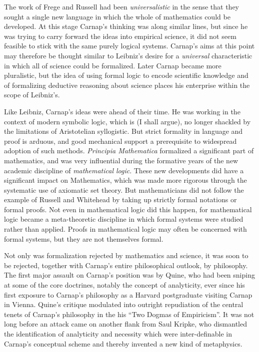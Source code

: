 The work of Frege and Russell had been \emph{universalistic} in the
sense that they sought a single new language in which the whole of
mathematics could be developed. 
At this stage Carnap's thinking was along similar lines, but since he
was trying to carry forward the ideas into empirical science, it did
not seem feasible to stick with the same purely logical systems. 
Carnap's aims at this point may therefore be thought similar to
Leibniz's desire for a \emph{universal} characteristic in which all of
science could be formalized. 
Later Carnap became more pluralistic, but the idea of using formal
logic to encode scientific knowledge and of formalizing deductive
reasoning about science places his enterprise within the scope of
Leibniz's. 

Like Leibniz, Carnap's ideas were ahead of their time.
He was working in the context of modern symbolic logic, which is (I
shall argue), no longer shackled by the limitations of Aristotelian
syllogistic. 
But strict formality in language and proof is arduous, and good
mechanical support a prerequisite to widespread adoption of such
methods. 
\emph{Principia Mathematica} formalized a significant part of
mathematics, and was very influential during the formative years of
the new academic discipline of \emph{mathematical logic}. 
These new developments did have a significant impact on Mathematics,
which was made more rigorous through the systematic use of axiomatic
set theory. 
But mathematicians did not follow the example of Russell and Whitehead
by taking up strictly formal notations or formal proofs. 
Not even in mathematical logic did this happen, for mathematical logic
became a meta-theoretic discipline in which formal systems were
studied rather than applied. 
Proofs in mathematical logic may often be concerned with formal
systems, but they are not themselves formal. 

Not only was formalization rejected by mathematics and science, it was
soon to be rejected, together with Carnap's entire philosophical
outlook, by philosophy. 
The first major assault on Carnap's position was by Quine, who had
been sniping at some of the core doctrines, notably the concept of
analyticity, ever since his first exposure to Carnap's philosophy as a
Harvard postgraduate visiting Carnap in Vienna. 
Quine's critique modulated into outright repudiation of the central
tenets of Carnap's philosophy in the his ``Two Dogmas of
Empiricism''. 
It was not long before an attack came on another flank from Saul
Kripke, who dismantled the identification of analyticity and necessity
which were inter-definable in Carnap's conceptual scheme and thereby
invented a new kind of metaphysics. 

